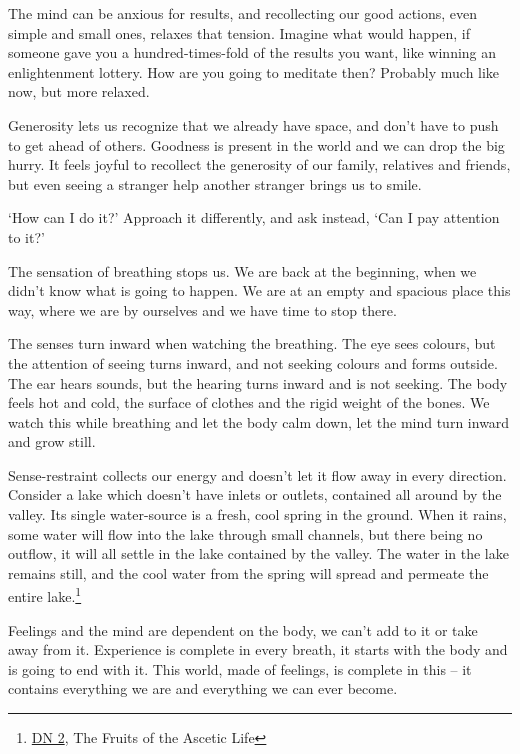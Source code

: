 The mind can be anxious for results, and recollecting our good actions,
even simple and small ones, relaxes that tension. Imagine what would
happen, if someone gave you a hundred-times-fold of the results you
want, like winning an enlightenment lottery. How are you going to
meditate then? Probably much like now, but more relaxed.

Generosity lets us recognize that we already have space, and don't have
to push to get ahead of others. Goodness is present in the world and we
can drop the big hurry. It feels joyful to recollect the generosity of
our family, relatives and friends, but even seeing a stranger help
another stranger brings us to smile.


`How can I do it?' Approach it differently, and ask instead, `Can I pay
attention to it?'

The sensation of breathing stops us. We are back at the beginning, when
we didn't know what is going to happen. We are at an empty and spacious
place this way, where we are by ourselves and we have time to stop
there.

The senses turn inward when watching the breathing. The eye sees
colours, but the attention of seeing turns inward, and not seeking
colours and forms outside. The ear hears sounds, but the hearing turns
inward and is not seeking. The body feels hot and cold, the surface of
clothes and the rigid weight of the bones. We watch this while breathing
and let the body calm down, let the mind turn inward and grow still.


\enlargethispage*{\baselineskip}

Sense-restraint collects our energy and doesn't let it flow away in
every direction. Consider a lake which doesn't have inlets or outlets,
contained all around by the valley. Its single water-source is a fresh,
cool spring in the ground. When it rains, some water will flow into the
lake through small channels, but there being no outflow, it will all
settle in the lake contained by the valley. The water in the lake
remains still, and the cool water from the spring will spread and
permeate the entire lake.\footnote{\href{https://suttacentral.net/dn2}{DN
  2}, The Fruits of the Ascetic Life}

Feelings and the mind are dependent on the body, we can't add to it or
take away from it. Experience is complete in every breath, it starts
with the body and is going to end with it. This world, made of feelings,
is complete in this -- it contains everything we are and everything we
can ever become.

